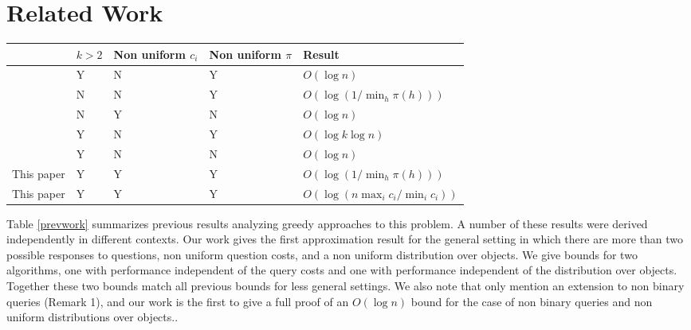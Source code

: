 \documentclass{article}
\begin{document}
\section{Related Work}

\begin{table*}[t]
\begin{center}
\begin{small}
\begin{tabular}{|c|llll|}
\hline 
& $k>2$ & Non uniform $c_i$ & Non uniform $\pi$ & Result \\
\hline 
\citet{optimalsplit} & Y & N & Y & $O(\log n)$ \\
\citet{greedy} & N & N & Y & $O(\log (1/\min_h \pi(h)))$ \\
\citet{approxoptimal} & N & Y & N & $O(\log n)$ \\
\citet{decisiontreesentity} & Y & N & Y & $O(\log k \log n)$ \\
\citet{approxdecision} & Y & N & N & $O(\log n)$ \\
This paper & Y & Y & Y & $O(\log (1/\min_h \pi(h)))$ \\
This paper & Y & Y & Y & $O(\log (n \max_i c_i / \min_i c_i))$ \\
\hline 
\end{tabular}
\end{small}
\end{center}
\caption{Summary of approximation ratios achieved by 
related work.  Here $n$ is the number of objects,
$k$ is the number of possible responses, $c_i$ are the question costs,
and $\pi$ is the distribution over objects.}
\label{prevwork}
\end{table*}

Table \ref{prevwork} summarizes previous results analyzing greedy
approaches to this problem.  A number of these results were derived
independently in different contexts.  Our work gives the first
approximation result for the general setting in which there are more
than two possible responses to questions, non uniform question costs,
and a non uniform distribution over objects.  We give bounds for two
algorithms, one with performance independent of the query costs and
one with performance independent of the distribution over objects.
Together these two bounds match all previous bounds for
less general settings.  We also note that \citet{optimalsplit} only mention
an extension to non binary queries (Remark 1), and our work is
the first to give a full proof of an $O(\log n)$ bound for the case of non
binary queries and non uniform distributions over objects..
\end{document}
